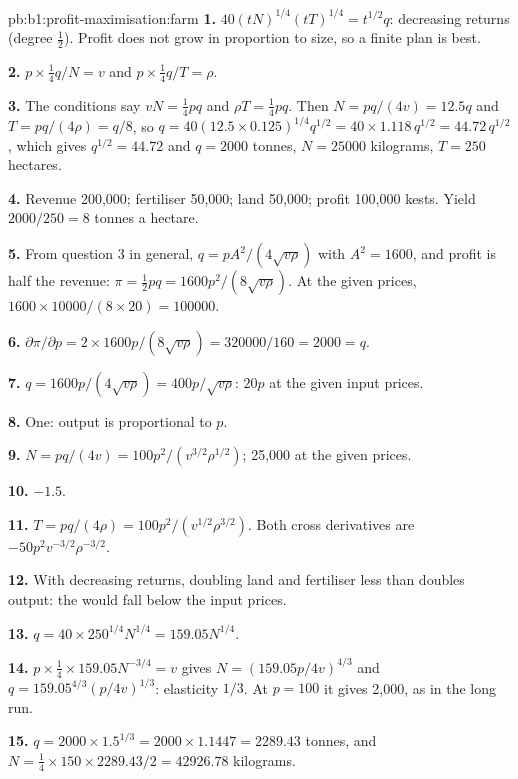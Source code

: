 \begin{solution}{pb:b1:profit-maximisation:farm}
\textbf{1.} $40(tN)^{1/4}(tT)^{1/4} = t^{1/2}q$: decreasing returns (degree $\tfrac12$).
Profit does not grow in proportion to size, so a finite plan is best.

\textbf{2.} $p \times \tfrac14q/N = v$ and $p \times \tfrac14q/T = \rho$.

\textbf{3.} The conditions say $vN = \tfrac14pq$ and $\rho T = \tfrac14pq$. Then
$N = pq/(4v) = 12.5q$ and $T = pq/(4\rho) = q/8$, so
$q = 40(12.5 \times 0.125)^{1/4}q^{1/2} = 40 \times 1.118\,q^{1/2} = 44.72\,q^{1/2}$, which gives
$q^{1/2} = 44.72$ and $q = 2000$ tonnes, $N = 25000$ kilograms, $T = 250$ hectares.

\textbf{4.} Revenue 200,000; fertiliser 50,000; land 50,000; profit 100,000
kests. Yield $2000/250 = 8$ tonnes a hectare.

\textbf{5.} From question 3 in general, $q = pA^2/(4\sqrt{v\rho})$ with $A^2 = 1600$, and
profit is half the revenue: $\pi = \tfrac12pq = 1600p^2/(8\sqrt{v\rho})$. At the
given prices, $1600 \times 10000/(8 \times 20) = 100000$.

\textbf{6.} $\partial\pi/\partial p = 2 \times 1600p/(8\sqrt{v\rho}) = 320000/160 = 2000 = q$.

\textbf{7.} $q = 1600p/(4\sqrt{v\rho}) = 400p/\sqrt{v\rho}$: $20p$ at the given input prices.

\textbf{8.} One: output is proportional to $p$.

\textbf{9.} $N = pq/(4v) = 100p^2/(v^{3/2}\rho^{1/2})$; 25,000 at the given prices.

\textbf{10.} $-1.5$.

\textbf{11.} $T = pq/(4\rho) = 100p^2/(v^{1/2}\rho^{3/2})$. Both cross derivatives are
$-50p^2v^{-3/2}\rho^{-3/2}$.

\textbf{12.} With decreasing returns, doubling land and fertiliser less than
doubles output: the  would fall below the input prices.

\textbf{13.} $q = 40 \times 250^{1/4}N^{1/4} = 159.05N^{1/4}$.

\textbf{14.} $p \times \tfrac14 \times 159.05N^{-3/4} = v$ gives $N = (159.05p/4v)^{4/3}$ and
$q = 159.05^{4/3}(p/4v)^{1/3}$: elasticity $1/3$. At $p = 100$ it gives 2,000, as in
the long run.

\textbf{15.} $q = 2000 \times 1.5^{1/3} = 2000 \times 1.1447 = 2289.43$ tonnes, and
$N = \tfrac14 \times 150 \times 2289.43/2 = 42926.78$ kilograms.


\end{solution}
